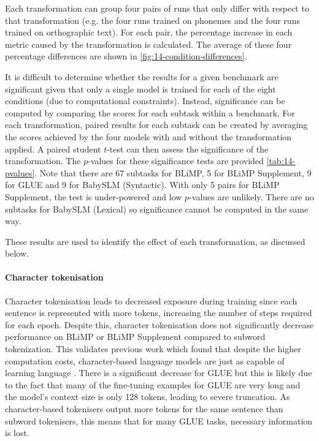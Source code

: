 Each transformation can group four pairs of runs that only differ with respect to that transformation (e.g. the four runs trained on phonemes and the four runs trained on orthographic text). For each pair, the percentage increase in each metric caused by the transformation is calculated. The average of these four percentage differences are shown in \cref{fig:14-condition-differences}.

It is difficult to determine whether the results for a given benchmark are significant given that only a single model is trained for each of the eight conditions (due to computational constraints). Instead, significance can be computed by comparing the  scores for each subtask within a benchmark. For each transformation, paired results for each subtask can be created by averaging the scores achieved by the four models with and without the transformation applied. A paired student $t$-test can then assess the significance of the transformation. The $p$-values for these significance tests are provided \cref{tab:14-pvalues}. Note that there are 67 subtasks for BLiMP, 5 for BLiMP Supplement, 9 for GLUE and 9 for BabySLM (Syntactic). With only 5 pairs for BLiMP Supplement, the test is under-powered and low $p$-values are unlikely. There are no subtasks for BabySLM (Lexical) so significance cannot be computed in the same way. 

These results are used to identify the effect of each transformation, as discussed below.

\paragraph{Character tokenisation} Character tokenisation leads to decreased exposure during training since each sentence is represented with more tokens, increasing the number of steps required for each epoch. Despite this, character tokenisation does not significantly decrease performance on BLiMP or BLiMP Supplement compared to subword tokenization. This validates previous work which found that despite the higher computation costs, character-based language models are just as capable of learning language \citep{al-rfou_character-level_2019, hahn-baroni-2019-tabula}. There is a significant decrease for GLUE but this is likely due to the fact that many of the fine-tuning examples for GLUE are very long and the model's context size is only 128 tokens, leading to severe truncation. As character-based tokenisers output more tokens for the same sentence than \bpe subword tokenisers, this means that for many GLUE tasks, necessary information is lost.

